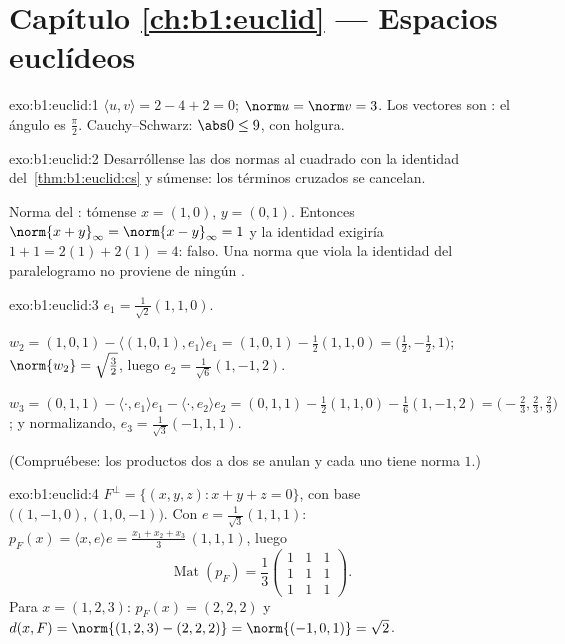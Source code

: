\section*{Capítulo \ref{ch:b1:euclid} --- Espacios euclídeos}

\begin{solution}{exo:b1:euclid:1}
$\langle u, v\rangle = 2 - 4 + 2 = 0$; $\norm u = \norm v = 3$. Los
vectores son : el ángulo es $\frac\pi2$. Cauchy--Schwarz:
$\abs 0 \leq 9$, con holgura.
\end{solution}

\begin{solution}{exo:b1:euclid:2}
Desarróllense las dos normas al cuadrado con la identidad
del~\cref{thm:b1:euclid:cs} y súmense: los términos cruzados se
cancelan.

Norma del : tómense $x = (1, 0)$, $y = (0, 1)$. Entonces
$\norm{x + y}_\infty = \norm{x - y}_\infty = 1$ y la identidad
exigiría $1 + 1 = 2(1) + 2(1) = 4$: falso. Una norma que viola la
identidad del paralelogramo no proviene de ningún .
\end{solution}

\begin{solution}{exo:b1:euclid:3}
$e_1 = \frac{1}{\sqrt 2}(1,1,0)$.

$w_2 = (1,0,1) - \langle (1,0,1), e_1\rangle e_1 = (1,0,1) -
\frac{1}{2}(1,1,0) = \bigl(\tfrac12, -\tfrac12, 1\bigr)$;
$\norm{w_2} = \sqrt{\tfrac32}$, luego
$e_2 = \frac{1}{\sqrt 6}(1, -1, 2)$.

$w_3 = (0,1,1) - \langle\cdot, e_1\rangle e_1 - \langle\cdot,
e_2\rangle e_2 = (0,1,1) - \frac12 (1,1,0) - \frac16(1,-1,2) =
\bigl(-\tfrac23, \tfrac23, \tfrac23\bigr)$; y normalizando,
$e_3 = \frac{1}{\sqrt 3}(-1, 1, 1)$.

(Compruébese: los productos dos a dos se anulan y cada uno tiene
norma $1$.)
\end{solution}

\begin{solution}{exo:b1:euclid:4}
$F^\perp = \{(x,y,z) : x + y + z = 0\}$, con base
$\bigl((1,-1,0), (1,0,-1)\bigr)$. Con
$e = \frac{1}{\sqrt3}(1,1,1)$: $p_F(x) = \langle x, e\rangle e =
\frac{x_1 + x_2 + x_3}{3}\,(1,1,1)$, luego
\[
\operatorname{Mat}(p_F) = \frac13
\begin{pmatrix} 1&1&1\\ 1&1&1\\ 1&1&1\end{pmatrix}.
\]
Para $x = (1,2,3)$: $p_F(x) = (2,2,2)$ y
$d(x, F) = \norm{(1,2,3) - (2,2,2)} = \norm{(-1,0,1)} = \sqrt 2$.
\end{solution}

